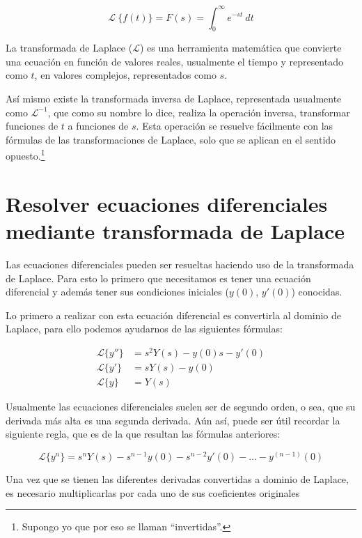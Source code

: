 
\begin{equation}
    \mathcal{L} \ \{f(t)\} = F(s) = \int_{0}^{\infty}e^{-st} \ dt
\end{equation}

La transformada de Laplace ($\mathcal{L}$) es una herramienta matemática que convierte una ecuación en función de valores reales, usualmente el tiempo y representado como $t$, en valores complejos, representados como $s$.

Así mismo existe la transformada inversa de Laplace, representada usualmente como $\mathcal{L}^{-1}$, que como su nombre lo dice, realiza la operación inversa, transformar funciones de $t$ a funciones de $s$. Esta operación se resuelve fácilmente con las fórmulas de las transformaciones de Laplace, solo que se aplican en el sentido opuesto.\footnote{Supongo yo que por eso se llaman ``invertidas''.}

\section{Resolver ecuaciones diferenciales mediante transformada de Laplace}

Las ecuaciones diferenciales pueden ser resueltas haciendo uso de la transformada de Laplace. Para esto lo primero que necesitamos es tener una ecuación diferencial y además tener sus condiciones iniciales ($y(0)$, $y'(0)$) conocidas.

Lo primero a realizar con esta ecuación diferencial es convertirla al dominio de Laplace, para ello podemos ayudarnos de las siguientes fórmulas:

\begin{align*}
    \mathcal{L} \{y''\} &= s^{2}Y(s) - y(0)s - y'(0)
    \\
    \mathcal{L} \{y'\} &= sY(s) - y(0)
    \\
    \mathcal{L} \{y\} &= Y(s)
\end{align*}

Usualmente las ecuaciones diferenciales suelen ser de segundo orden, o sea, que su derivada más alta es una segunda derivada. Aún así, puede ser útil recordar la siguiente regla, que es de la que resultan las fórmulas anteriores:

\begin{equation*}
    \mathcal{L} \{y^{n}\} = s^{n}Y(s) - s^{n-1}y(0) - s^{n-2}y'(0) - \ldots - y^{(n-1)}(0)
\end{equation*}

Una vez que se tienen las diferentes derivadas convertidas a dominio de Laplace, es necesario multiplicarlas por cada uno de sus coeficientes originales

